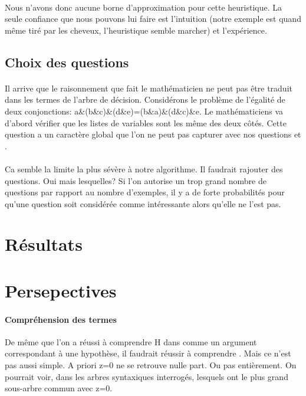 \paragraph{} Nous n'avons donc aucune borne d'approximation pour cette heuristique. La seule confiance que nous pouvons lui faire est l'intuition (notre exemple est quand même tiré par les cheveux, l'heuristique semble marcher) et l'expérience.

\subsection*{Choix des questions}
\paragraph{} Il arrive que le raisonnement que fait le mathématicien ne peut pas être traduit dans les termes de l'arbre de décision. Considérons le problème de l'égalité de deux conjonctions: a\&(b\&c)\&(d\&e)=(b\&a)\&(d\&c)\&e. Le mathématiciens va d'abord vérifier que les listes de variables sont les même des deux côtés. Cette question a un caractère global que l'on ne peut pas capturer avec nos questions  et .

\paragraph{} Ca semble la limite la plus sévère à notre algorithme. Il faudrait rajouter des questions. Oui mais lesquelles? Si l'on autorise un trop grand nombre de questions par rapport au nombre d'exemples, il y a de forte probabilités pour qu'une question soit considérée comme intéressante alors qu'elle ne l'est pas.

\section{Résultats}

\section{Persepectives}
\paragraph{Compréhension des termes} De même que l'on a réussi à comprendre H dans  comme un argument correspondant à une hypothèse, il faudrait réussir à comprendre . Mais ce n'est pas aussi simple. A priori z=0 ne se retrouve nulle part. Ou pas entièrement. On pourrait voir, dans les arbres syntaxiques interrogés, lesquels ont le plus grand sous-arbre commun avec z=0.

